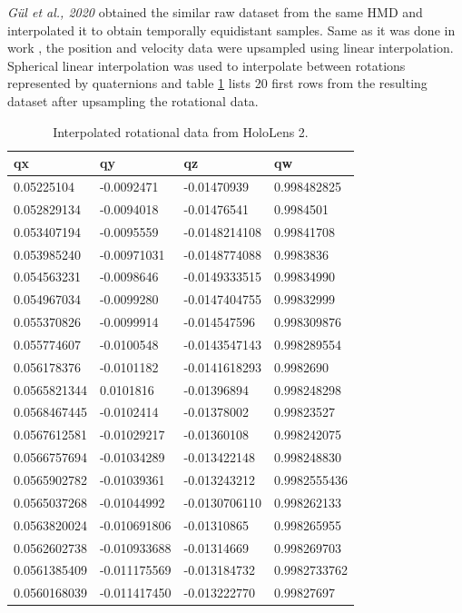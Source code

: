 \textit{Gül et al., 2020} obtained the similar raw dataset from the same HMD and interpolated it to obtain temporally equidistant samples. Same as it was done in work \cite{serhan_kalman}, the position and velocity data were upsampled using linear interpolation. Spherical linear interpolation was used to interpolate between rotations represented by quaternions and  table \ref{tab:inter_data_rot} lists 20 first rows from the resulting dataset after upsampling the rotational data.

\begin{table}[!ht]
	\footnotesize
	\centering
	\begin{tabular}{|l|l|l|l|}
		\hline
		qx & qy & qz  & qw \\ [0.5ex] 
		\hline\hline
		0.05225104 & -0.0092471 & -0.01470939 & 0.998482825\\ \hline
		0.052829134 & -0.0094018 & -0.01476541 & 0.9984501\\ \hline
		0.053407194	& -0.0095559 & -0.0148214108 & 0.99841708 \\ \hline
		0.053985240 & -0.00971031 & -0.0148774088 & 0.9983836 \\ \hline
		0.054563231 & -0.0098646 & -0.0149333515 & 0.99834990 \\ \hline
		0.054967034 & -0.0099280 & -0.0147404755 & 0.99832999 \\ \hline
		0.055370826 & -0.0099914 & -0.014547596 & 0.998309876 \\ \hline
		0.055774607 & -0.0100548 & -0.0143547143 & 0.998289554 \\ \hline
		0.056178376 & -0.0101182 & -0.0141618293 & 0.9982690 \\ \hline
		0.0565821344 & 0.0101816 & -0.01396894 & 0.998248298 \\ \hline
		0.0568467445 & -0.0102414 & -0.01378002 & 0.99823527 \\ \hline
		0.0567612581 & -0.01029217 & -0.01360108 & 0.998242075 \\ \hline
		0.0566757694 & -0.01034289 & -0.013422148 & 0.998248830 \\ \hline
		0.0565902782 & -0.01039361 & -0.013243212 & 0.9982555436 \\ \hline
		0.0565037268 & -0.01044992 & -0.0130706110 & 0.998262133 \\ \hline
		0.0563820024 & -0.010691806 & -0.01310865 & 0.998265955 \\ \hline
		0.0562602738 & -0.010933688 & -0.01314669 & 0.998269703 \\ \hline
		0.0561385409 & -0.011175569 & -0.013184732 & 0.9982733762 \\ \hline
		0.0560168039 & -0.011417450 & -0.013222770 & 0.99827697 \\ \hline
	\end{tabular}
	\caption{\label{tab:inter_data_rot}Interpolated rotational data from HoloLens 2.}
\end{table}

